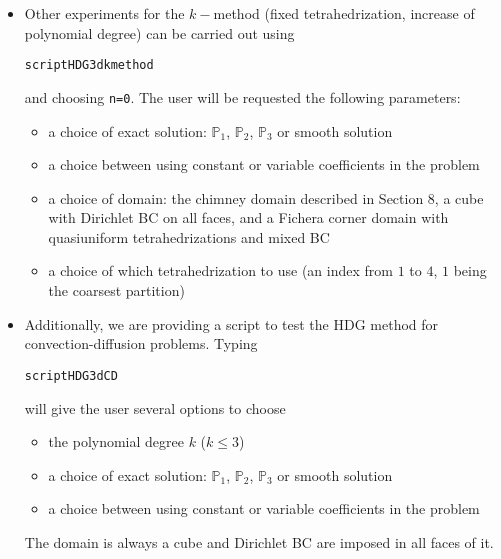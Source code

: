 \documentclass[12pt,twoside,english,a4paper]{article}
\numberwithin{equation}{section}
\begin{document}
\begin{itemize}
\item Other experiments for the $k-$method (fixed tetrahedrization, increase of polynomial degree) can be carried out using 
\begin{verbatim}
scriptHDG3dkmethod
\end{verbatim}
and choosing {\tt n=0}. The user will be requested the following parameters:
\begin{itemize}
\item a choice of exact solution:  $\mathbb P_1$, $\mathbb P_2$, $\mathbb P_3$ or smooth solution
\item a choice between using constant or variable coefficients in the problem
\item a choice of domain: the chimney domain described in Section 8,  a cube with Dirichlet BC on all faces, and a Fichera corner domain with quasiuniform tetrahedrizations and mixed BC
\item a choice of which tetrahedrization to use (an index from $1$ to $4$, $1$ being the coarsest partition)
\end{itemize}
\item Additionally, we are providing a script to test the HDG method for convection-diffusion problems. Typing
\begin{verbatim}
scriptHDG3dCD
\end{verbatim}
will give the user several options to choose 
\begin{itemize}
\item the polynomial degree $k$ ($k\le 3$)
\item a choice of exact solution:  $\mathbb P_1$, $\mathbb P_2$, $\mathbb P_3$ or smooth solution
\item a choice between using constant or variable coefficients in the problem
\end{itemize}
The domain is always a cube and Dirichlet BC are imposed in all faces of it.
\end{itemize}
\end{document}

